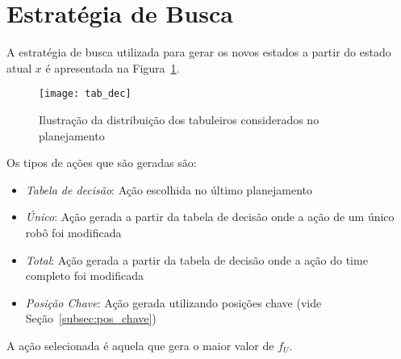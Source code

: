 \section{Estratégia de Busca}\label{sec:est_busca}
A estratégia de busca utilizada para gerar os novos
estados a partir do estado atual $x$ é apresentada na
Figura~\ref{fig:estr_busca}.

\begin{figure}[H]
  \centering
  \texttt{[image: tab\_dec]}
  \caption{Ilustração da distribuição dos tabuleiros
           considerados no planejamento}\label{fig:estr_busca}
\end{figure}

Os tipos de ações que são geradas são:
\begin{itemize}
  \item \textit{Tabela de decisão}: Ação escolhida no último planejamento
  \item \textit{Único}: Ação gerada a partir da tabela de decisão
        onde a ação de um único robô foi modificada
  \item \textit{Total}: Ação gerada a partir da tabela de decisão
        onde a ação do time completo foi modificada
  \item \textit{Posição Chave}: Ação gerada utilizando posições chave
        (vide Seção~\ref{subsec:pos_chave})
\end{itemize}

A ação selecionada é aquela que gera o maior valor de $f_U$.




